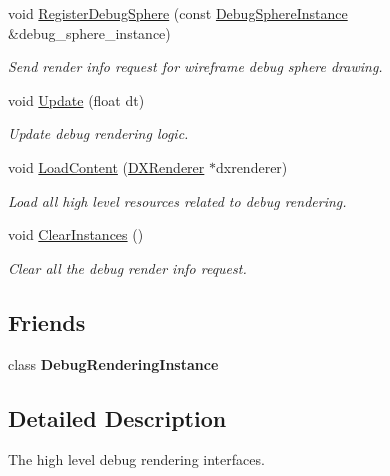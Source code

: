 \begin{DoxyCompactItemize}
void \hyperlink{classDebugRendering_a43b18f36eff07b60f7dcace9549c126b}{Register\+Debug\+Sphere} (const \hyperlink{structDebugSphereInstance}{Debug\+Sphere\+Instance} \&debug\+\_\+sphere\+\_\+instance)
\begin{DoxyCompactList}\small\item\em Send render info request for wireframe debug sphere drawing. \end{DoxyCompactList}\item 
void \hyperlink{classDebugRendering_acdce8201c1a8f304b70bf278fd7b9cdb}{Update} (float dt)
\begin{DoxyCompactList}\small\item\em Update debug rendering logic. \end{DoxyCompactList}\item 
void \hyperlink{classDebugRendering_a2b3fd46f7880bcf6a57eb1b3af5dbc6d}{Load\+Content} (\hyperlink{classDXRenderer}{D\+X\+Renderer} $\ast$dxrenderer)
\begin{DoxyCompactList}\small\item\em Load all high level resources related to debug rendering. \end{DoxyCompactList}\item 
\mbox{\label{classDebugRendering_a9251ff1132aa73c074d369ddb6d7ab03}} 
void \hyperlink{classDebugRendering_a9251ff1132aa73c074d369ddb6d7ab03}{Clear\+Instances} ()
\begin{DoxyCompactList}\small\item\em Clear all the debug render info request. \end{DoxyCompactList}\end{DoxyCompactItemize}
\subsection*{Friends}
\begin{DoxyCompactItemize}
\item 
\mbox{\label{classDebugRendering_aa2fce3a4ae64b69f01e0fd64ba26023a}} 
class {\bfseries Debug\+Rendering\+Instance}
\end{DoxyCompactItemize}


\subsection{Detailed Description}
The high level debug rendering interfaces. 

